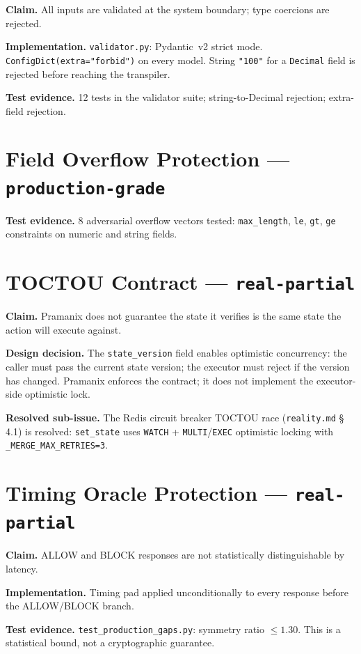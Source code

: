 \documentclass[12pt,a4paper,oneside]{report}
\newcommand{\fname}[1]{\texttt{#1}}          %
\newcommand{\code}[1]{\texttt{#1}}           %
\newcommand{\cfrsec}[1]{\S\,#1}             %
\begin{document}
\textbf{Claim.}  All inputs are validated at the system boundary; type
coercions are rejected.

\textbf{Implementation.}  \fname{validator.py}: Pydantic~v2 strict mode.
\code{ConfigDict(extra="forbid")} on every model.  String \code{"100"} for a
\code{Decimal} field is rejected before reaching the transpiler.

\textbf{Test evidence.}  12 tests in the validator suite; string-to-Decimal
rejection; extra-field rejection.

\section{Field Overflow Protection --- \code{production-grade}}

\textbf{Test evidence.}  8 adversarial overflow vectors tested:
\code{max\_length}, \code{le}, \code{gt}, \code{ge} constraints on numeric
and string fields.

\section{TOCTOU Contract --- \code{real-partial}}

\textbf{Claim.}  Pramanix does not guarantee the state it verifies is the
same state the action will execute against.

\textbf{Design decision.}  The \code{state\_version} field enables
optimistic concurrency: the caller must pass the current state version;
the executor must reject if the version has changed.  Pramanix enforces
the contract; it does not implement the executor-side optimistic lock.

\textbf{Resolved sub-issue.}  The Redis circuit breaker TOCTOU race
(\fname{reality.md} \cfrsec{4.1}) is resolved: \code{set\_state} uses
\code{WATCH} + \code{MULTI}/\code{EXEC} optimistic locking with
\code{\_MERGE\_MAX\_RETRIES=3}.

\section{Timing Oracle Protection --- \code{real-partial}}

\textbf{Claim.}  ALLOW and BLOCK responses are not statistically
distinguishable by latency.

\textbf{Implementation.}  Timing pad applied unconditionally to every
response before the ALLOW/BLOCK branch.

\textbf{Test evidence.}  \fname{test\_production\_gaps.py}: symmetry ratio
$\leq 1.30$.  This is a statistical bound, not a cryptographic guarantee.
\end{document}
